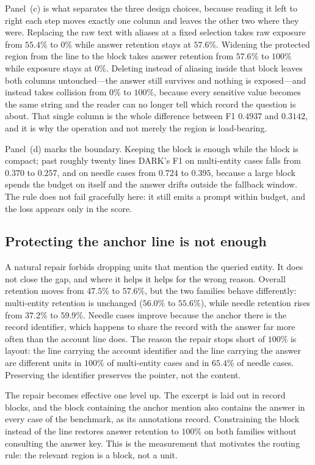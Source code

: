 Panel~(c) is what separates the three design choices, because reading it left to right each
step moves exactly one column and leaves the other two where they were. Replacing the raw
text with aliases at a fixed selection takes raw exposure from $55.4\%$ to $0\%$ while answer
retention stays at $57.6\%$. Widening the protected region from the line to the block takes
answer retention from $57.6\%$ to $100\%$ while exposure stays at $0\%$. Deleting instead of
aliasing inside that block leaves both columns untouched---the answer still survives and
nothing is exposed---and instead takes collision from $0\%$ to $100\%$, because every
sensitive value becomes the same string and the reader can no longer tell which record the
question is about. That single column is the whole difference between F1 $0.4937$ and
$0.3142$, and it is why the operation and not merely the region is load-bearing.

Panel~(d) marks the boundary. Keeping the block is enough while the block is compact; past
roughly twenty lines DARK's F1 on multi-entity cases falls from $0.370$ to $0.257$, and on
needle cases from $0.724$ to $0.395$, because a large block spends the budget on itself and
the answer drifts outside the fallback window. The rule does not fail gracefully here: it
still emits a prompt within budget, and the loss appears only in the score.

\subsection{Protecting the anchor line is not enough}
A natural repair forbids dropping units that mention the queried entity. It does not close the
gap, and where it helps it helps for the wrong reason. Overall retention moves from $47.5\%$
to $57.6\%$, but the two families behave differently: multi-entity retention is unchanged
($56.0\%$ to $55.6\%$), while needle retention rises from $37.2\%$ to $59.9\%$. Needle cases
improve because the anchor there is the record identifier, which happens to share the record
with the answer far more often than the account line does. The reason the repair stops short
of $100\%$ is layout: the line carrying the account identifier and the line carrying the
answer are different units in $100\%$ of multi-entity cases and in $65.4\%$ of needle cases.
Preserving the identifier preserves the pointer, not the content.

The repair becomes effective one level up. The excerpt is laid out in record blocks, and the
block containing the anchor mention also contains the answer in every case of the
benchmark, as its annotations record. Constraining the block instead of the line restores answer
retention to $100\%$ on both families without consulting the answer key. This is the
measurement that motivates the routing rule: the relevant region is a block, not a unit.

